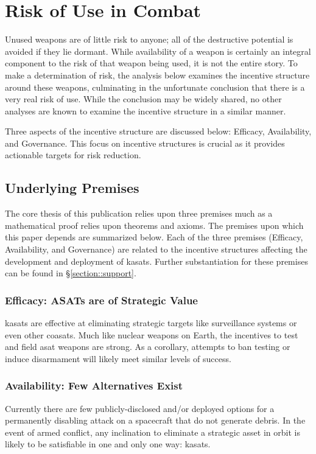 \section{Risk of Use in Combat}
\label{section::risk}

Unused weapons are of little risk to anyone; all of the destructive
potential is avoided if they lie dormant.  While availability of a
weapon is certainly an integral component to the risk of that weapon
being used, it is not the entire story.  To make a determination of
risk, the analysis below examines the incentive structure around these
weapons, culminating in the unfortunate conclusion that there is a
very real risk of use.  While the conclusion may be widely shared, no
other analyses are known to examine the incentive structure in a
similar manner.

Three aspects of the incentive structure are discussed below:
Efficacy, Availability, and Governance.  This focus on incentive
structures is crucial as it provides actionable targets for risk
reduction.


\subsection{Underlying Premises}

The core thesis of this publication relies upon three premises much as
a mathematical proof relies upon theorems and axioms.  The premises
upon which this paper depends are summarized below.  Each of the three
premises (Efficacy, Availability, and Governance) are related to the
incentive structures affecting the development and deployment of
\acp{kasat}.  Further substantiation for these premises can be found
in \S\ref{section::support}.

\subsubsection{Efficacy: ASATs are of Strategic Value}
\acp{kasat} are effective at eliminating strategic targets like
surveillance systems or even other \acp{coasat}.  Much like nuclear
weapons on Earth, the incentives to test and field \ac{asat} weapons
are strong.  As a corollary, attempts to ban testing or induce
disarmament will likely meet similar levels of success.

\subsubsection{Availability: Few Alternatives Exist}
Currently there are few publicly-disclosed and/or deployed options for
a permanently disabling attack on a spacecraft that do not generate
debris.  In the event of armed conflict, any inclination to eliminate
a strategic asset in orbit is likely to be satisfiable in one and only
one way: \acp{kasat}.

